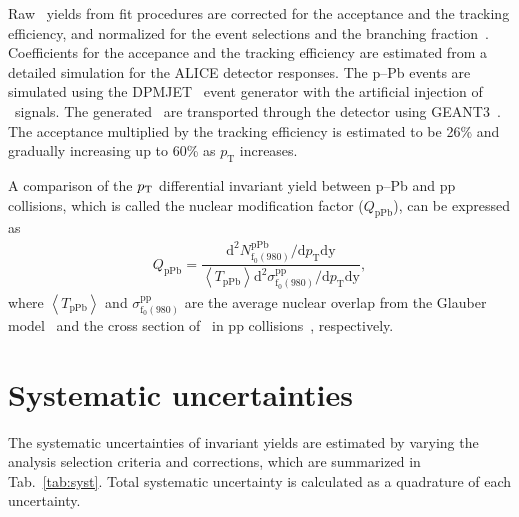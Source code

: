 Raw \fzero~yields from fit procedures are corrected for the acceptance and the tracking efficiency, and normalized for the event selections and the branching fraction~\cite{ALICE:2022qnb}. Coefficients for the accepance and the tracking efficiency are estimated from a detailed simulation for the ALICE detector responses. The p--Pb events are simulated using the DPMJET~\cite{Fedynitch:2015kcn} event generator with the artificial injection of \fzero~signals. The generated \fzero~are transported through the detector using GEANT3~\cite{Brun:1994aa}. The acceptance multiplied by the tracking efficiency is estimated to be 26\% and gradually increasing up to 60\% as $p_{\mathrm{T}}$ increases. 

A comparison of the $p_{\rm{T}}$ differential invariant yield between p--Pb and pp collisions, which is called the nuclear modification factor ($Q_{\mathrm{pPb}}$), can be expressed as
\begin{eqnarray}
Q_{\mathrm{pPb}} = \dfrac{\mathrm{d}^{2} N_{\mathrm{f}_{0}(980)}^{\mathrm{pPb}} / \mathrm{d} p_{\mathrm{T}} \mathrm{dy} }{ \left\langle T_{\mathrm{pPb}} \right\rangle \mathrm{d}^{2} \sigma_{\mathrm{f}_{0}(980)}^{\mathrm{pp}}/ \mathrm{d} p_{\mathrm{T}} \mathrm{dy} },
\end{eqnarray}
where $\left\langle T_{\mathrm{pPb}} \right\rangle$ and $\sigma_{\mathrm{f}_{0}(980)}^{\mathrm{pp}}$ are the average nuclear overlap from the Glauber model~\cite{Miller:2007ri} and the cross section of \fzero~in pp collisions~\cite{ALICE:2022qnb}, respectively. 

\section{Systematic uncertainties}
\label{sec:syst}
The systematic uncertainties of invariant yields are estimated by varying the analysis selection criteria and corrections, which are summarized in Tab.~\ref{tab:syst}. Total systematic uncertainty is calculated as a quadrature of each uncertainty.

